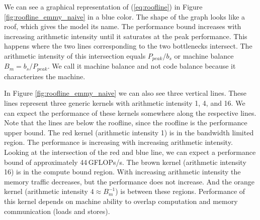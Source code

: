We can see a graphical representation of (\ref{eq:roofline}) in Figure \ref{fig:roofline_emmy_naive} in a blue color. The shape of the graph looks like a roof, which gives the model its name.
The performance bound increases with increasing arithmetic intensity until it saturates at the peak performance. This happens where the two lines corresponding to the two bottlenecks intersect. The arithmetic intensity of this intersection equals $P_{peak}/b_s$ or machine balance $B_m=b_s/P_{peak}$. We call it machine balance and not code balance because it characterizes the machine.

In Figure \ref{fig:roofline_emmy_naive} we can also see three vertical lines. These lines represent three generic kernels with arithmetic intensity 1, 4, and 16. We can expect the performance of these kernels somewhere along the respective lines.
Note that the lines are below the roofline, since the roofline is the performance upper bound.
The red kernel (arithmetic intensity 1) is in the bandwidth limited region. The performance is increasing with increasing arithmetic intensity. Looking at the intersection of the red and blue line, we can expect a performance bound of approximately 44\,GFLOPs/s.
The brown kernel (arithmetic intensity 16) is in the compute bound region. With increasing arithmetic intensity the memory traffic decreases, but the performance does not increase.
And the orange kernel (arithmetic intensity $4 \approx B_m^{-1}$) is between these regions. Performance of this kernel depends on machine ability to overlap computation and memory communication (loads and stores).



